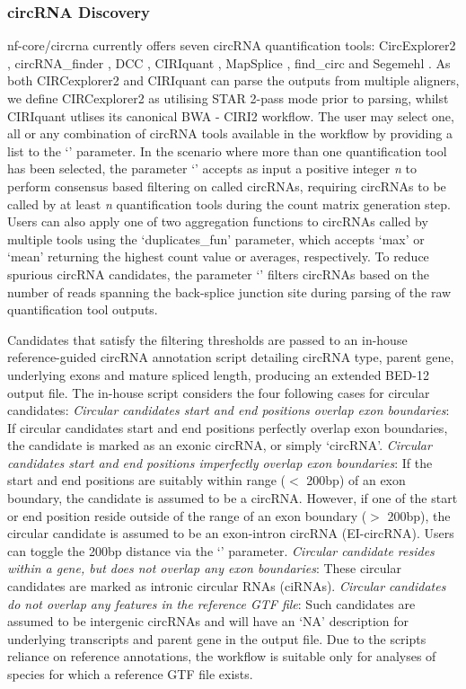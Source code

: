 \subsubsection{circRNA Discovery}
nf-core/circrna currently offers seven circRNA quantification tools: CircExplorer2 \cite{CIRCexplorer2}, circRNA\_finder \cite{circRNAfinder}, DCC \cite{DCC}, CIRIquant \cite{CIRIquant}, MapSplice \cite{MapSplice}, find\_circ \cite{findcirc} and Segemehl \cite{segemehl}. As both CIRCexplorer2 and CIRIquant can parse the outputs from multiple aligners, we define CIRCexplorer2 as utilising STAR \cite{STAR} 2-pass mode prior to parsing, whilst CIRIquant utlises its canonical BWA \cite{BWA} - CIRI2 \cite{CIRI2} workflow. The user may select one, all or any combination of circRNA tools available in the workflow by providing a list to the `' parameter. In the scenario where more than one quantification tool has been selected, the parameter `' accepts as input a positive integer \textit{n} to perform consensus based filtering on called circRNAs, requiring circRNAs to be called by at least \textit{n} quantification tools during the count matrix generation step. Users can also apply one of two aggregation functions to circRNAs called by multiple tools using the `\code{-{}-}duplicates\_fun' parameter, which accepts `max' or `mean' returning the highest count value or averages, respectively. To reduce spurious circRNA candidates, the parameter `' filters circRNAs based on the number of reads spanning the back-splice junction site during parsing of the raw quantification tool outputs.
\par 
Candidates that satisfy the filtering thresholds are passed to an in-house reference-guided circRNA annotation script detailing circRNA type, parent gene, underlying exons and mature spliced length, producing an extended BED-12 output file. The in-house script considers the four following cases for circular candidates: \textit{Circular candidates start and end positions overlap exon boundaries}: If circular candidates start and end positions perfectly overlap exon boundaries, the
candidate is marked as an exonic circRNA, or simply `circRNA'. \textit{Circular candidates start and end positions imperfectly overlap exon boundaries}: If the start and end positions are suitably within range ($<$ 200bp) of an exon boundary, the candidate is assumed to be a circRNA. However, if one of the start or end position reside outside of the range of an exon boundary ($>$ 200bp), the circular candidate is assumed to be an exon-intron circRNA (EI-circRNA). Users can toggle the 200bp distance via the `' parameter. \textit{Circular candidate resides within a gene, but does not overlap any exon boundaries}: These circular candidates are marked as intronic circular RNAs (ciRNAs). \textit{Circular candidates do not overlap any features in the reference GTF file}: Such candidates are assumed to be intergenic circRNAs and will have an `NA' description for underlying transcripts and parent gene in the output file. Due to the scripts reliance on reference annotations, the workflow is suitable only for analyses of species for which a reference GTF file exists.
